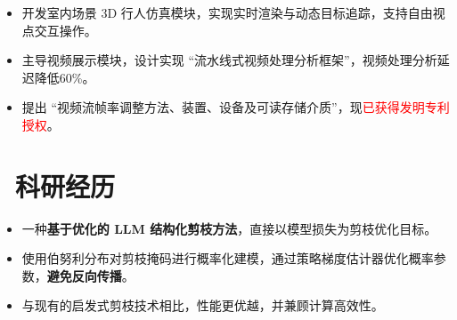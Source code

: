 \documentclass{resume}
\begin{document}

\begin{itemize}
  \item 开发室内场景 3D 行人仿真模块，实现实时渲染与动态目标追踪，支持自由视点交互操作。
  \item 主导视频展示模块，设计实现 “流水线式视频处理分析框架”，视频处理分析延迟降低60\%。
  \item 提出 “视频流帧率调整方法、装置、设备及可读存储介质”，现\textcolor{red}{已获得发明专利授权}。%
\end{itemize}

\vspace{-3mm}
\section{\faSearch\ 科研经历}
\begin{itemize}
  \item 一种\textbf{基于优化的 LLM 结构化剪枝方法}，直接以模型损失为剪枝优化目标。
  \item 使用伯努利分布对剪枝掩码进行概率化建模，通过策略梯度估计器优化概率参数，\textbf{避免反向传播}。
  \item 与现有的启发式剪枝技术相比，性能更优越，并兼顾计算高效性。
\end{itemize}


\end{document}
